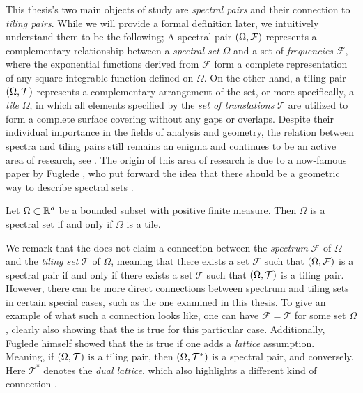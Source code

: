 \documentclass[../thesis.tex]{subfiles}
\begin{document}
This thesis's two main objects of study are \emph{spectral pairs} and their connection to \emph{tiling pairs}. While we will provide a formal definition later, we intuitively understand them to be the following; A spectral pair $(\Omega,\mathcal{F})$ represents a complementary relationship between a \emph{spectral set} $\Omega$ and a set of \emph{frequencies} $\mathcal{F}$, where the exponential functions derived from $\mathcal{F}$ form a complete representation of any square-integrable function defined on $\Omega$. On the other hand, a tiling pair $(\Omega,\mathcal{T})$ represents a complementary arrangement of the set, or more specifically, a \emph{tile} $\Omega$, in which all elements specified by the \emph{set of translations} $\mathcal{T}$ are utilized to form a complete surface covering without any gaps or overlaps. Despite their individual importance in the fields of analysis and geometry, the relation between spectra and tiling pairs still remains an enigma and continues to be an active area of research, see \cite{levFugledeConjectureConvex2022,kissFugledeConjectureHolds2022}. The origin of this area of research is due to a now-famous paper by Fuglede \cite{fugledeCommutingSelfadjointPartial1974}, who put forward the idea that there should be a geometric way to describe spectral sets \cite{lagariasOrthonormalBasesExponentials2000,liDualityPropertiesSpectra2010}. 

\begin{conjecture}\label{conj:fuglede}  
    Let $\Omega\subset \mathbb{R}^d$ be a bounded subset with positive finite measure. Then $\Omega$ is a spectral set if and only if $\Omega$ is a tile. 
\end{conjecture}

We remark that the  does not claim a connection between the \emph{spectrum} $\mathcal{F}$ of $\Omega$ and the \emph{tiling set} $\mathcal{T}$ of $\Omega$, meaning that there exists a set $\mathcal{F}$ such that $(\Omega,\mathcal{F})$ is a spectral pair if and only if there exists a set $\mathcal{T}$ such that $(\Omega,\mathcal{T})$ is a tiling pair. However, there can be more direct connections between spectrum and tiling sets in certain special cases, such as the one examined in this thesis. To give an example of what such a connection looks like, one can have $\mathcal{F}=\mathcal{T}$ for some set $\Omega$, clearly also showing that the  is true for this particular case. Additionally, Fuglede himself showed that the  is true if one adds a \emph{lattice} assumption. Meaning, if $(\Omega,\mathcal{T})$ is a tiling pair, then $(\Omega,\mathcal{T^*})$ is a spectral pair, and conversely. Here $\mathcal{T^*}$ denotes the \emph{dual lattice}, which also highlights a different kind of connection \cite{fugledeCommutingSelfadjointPartial1974}.
\end{document}

